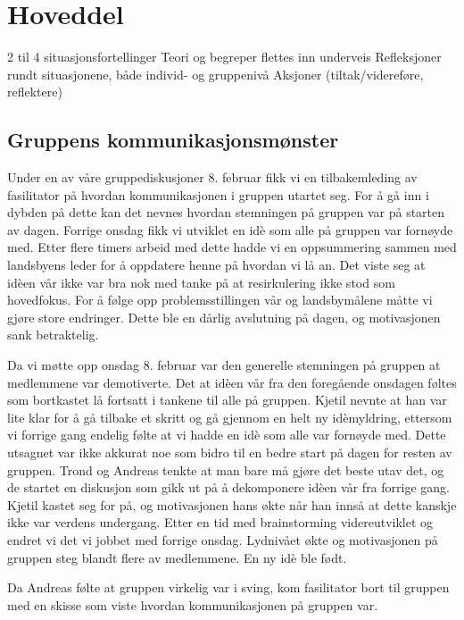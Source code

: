 \section{Hoveddel}
2 til 4 situasjonsfortellinger
Teori og begreper flettes inn underveis
Refleksjoner rundt situasjonene, både individ- og gruppenivå
Aksjoner (tiltak/videreføre, reflektere)


\subsection{Gruppens kommunikasjonsmønster} %
Under en av våre gruppediskusjoner 8. februar fikk vi en tilbakemleding av fasilitator på hvordan kommunikasjonen i gruppen utartet seg. For å gå inn i dybden på dette kan det nevnes hvordan stemningen på gruppen var på starten av dagen. Forrige onsdag fikk vi utviklet en idè som alle på gruppen var fornøyde med. Etter flere timers arbeid med dette hadde vi en oppsummering sammen med landsbyens leder for å oppdatere henne på hvordan vi lå an. Det viste seg at idèen vår ikke var bra nok med tanke på at resirkulering ikke stod som hovedfokus. For å følge opp problemsstillingen vår og landsbymålene måtte vi gjøre store endringer. Dette ble en dårlig avslutning på dagen, og motivasjonen sank betraktelig. 

Da vi møtte opp onsdag 8. februar var den generelle stemningen på gruppen at medlemmene var demotiverte. Det at idèen vår fra den foregående onsdagen føltes som bortkastet lå fortsatt i tankene til alle på gruppen. Kjetil nevnte at han var lite klar for å gå tilbake et skritt og gå gjennom en helt ny idèmyldring, ettersom vi forrige gang endelig følte at vi hadde en idè som alle var fornøyde med. Dette utsagnet var ikke akkurat noe som bidro til en bedre start på dagen for resten av gruppen. Trond og Andreas tenkte at man bare må gjøre det beste utav det, og de startet en diskusjon som gikk ut på å dekomponere idèen vår fra forrige gang. Kjetil kastet seg for på, og motivasjonen hans økte når han innså at dette kanskje ikke var verdens undergang. Etter en tid med brainstorming videreutviklet og endret vi det vi jobbet med forrige onsdag. Lydnivået økte og motivasjonen på gruppen steg blandt flere av medlemmene. En ny idè ble født. \cite{google.no}

Da Andreas følte at gruppen virkelig var i sving, kom fasilitator bort til gruppen med en skisse som viste hvordan kommunikasjonen på gruppen var.

